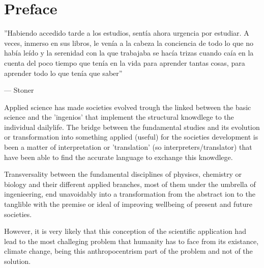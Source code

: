 \chapter*{Preface\label{cha:preface}}

\epigraphfontsize{\small\itshape}
\epigraph{''Habiendo accedido tarde a los estudios, sentía ahora urgencia por estudiar. A veces, inmerso en sus libros, le venía a la cabeza la conciencia de todo lo que no había leído y la serenidad con la que trabajaba se hacía trizas cuando caía en la cuenta del poco tiempo que tenía en la vida para aprender tantas cosas, para aprender todo lo que tenía que saber''}{--- \textup{Stoner}}

Applied science has made societies evolved trough the linked between the basic science and the 'ingenios' that implement the structural knowdlege to the individual dailylife. The bridge between the fundamental studies and its evolution or transformation into something applied (useful) for the societies development is been a matter of interpretation or 'translation' (so interpreters/translator) that have been able to find the accurate language to exchange this knowdlege.


Transversality between the fundamental disciplines of physiscs, chemistry or biology and their different applied branches, most of them under the umbrella of ingenieering, end unavoidably into a transformation from the abstract
ion to the tanglible with the premise or ideal of improving wellbeing of present and future societies.


However, it is very likely that this conception of the scientific application had lead to the most challeging problem that humanity has to face from its existance, climate change, being this anthropocentrism part of the problem and not of the solution.

